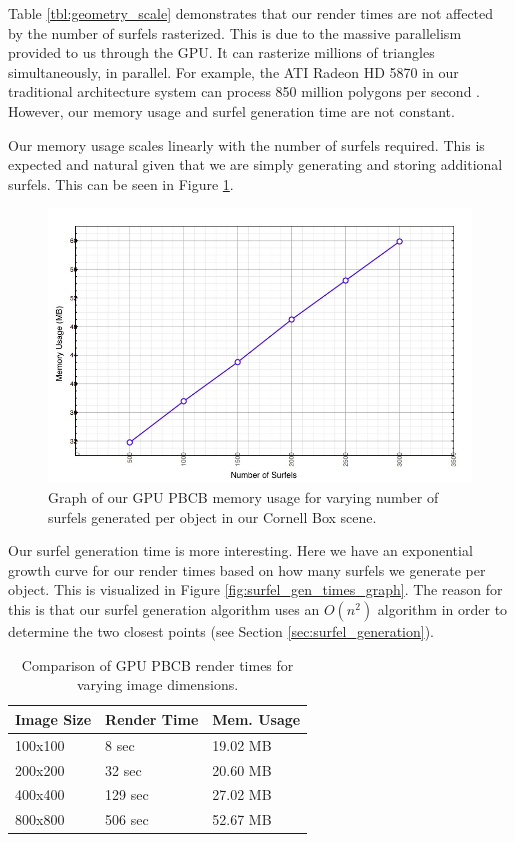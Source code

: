 Table \ref{tbl:geometry_scale} demonstrates that our render times are not affected by the number of surfels rasterized. This is due to the massive parallelism provided to us through the GPU. It can rasterize millions of triangles simultaneously, in parallel. For example, the ATI Radeon HD 5870 in our traditional architecture system can process 850 million polygons per second \cite{bib:ati5870}. However, our memory usage and surfel generation time are not constant.

Our memory usage scales linearly with the number of surfels required. This is expected and natural given that we are simply generating and storing additional surfels. This can be seen in Figure \ref{fig:surfel_memusg}.

\begin{figure}[h!]
    \centering
    \includegraphics[width=150mm]{../img/surfel_memusg.png}
    \caption[Surfel Memory Usage Graph]{Graph of our GPU PBCB memory usage for varying number of surfels generated per object in our Cornell Box scene.}
    \label{fig:surfel_memusg}
\end{figure}

Our surfel generation time is more interesting. Here we have an exponential growth curve for our render times based on how many surfels we generate per object. This is visualized in Figure \ref{fig:surfel_gen_times_graph}. The reason for this is that our surfel generation algorithm uses an $O(n^{2})$ algorithm in order to determine the two closest points (see Section \ref{sec:surfel_generation}).

\begin{table}[h!]
   \centering
   \begin{tabular}{ | l | l | l | }
   \hline
   \textbf{Image Size} & \textbf{Render Time} & \textbf{Mem. Usage} \\ \hline
   100x100 & 8 sec & 19.02 MB \\ \hline
   200x200 & 32 sec & 20.60 MB \\ \hline
   400x400 & 129 sec & 27.02 MB \\ \hline
   800x800 & 506 sec & 52.67 MB\\ \hline
   \end{tabular}
   \captionfonts
   \caption[Scalability: Image Size]{Comparison of GPU PBCB render times for varying image dimensions.}
   \label{tbl:img_scale}
\end{table}

